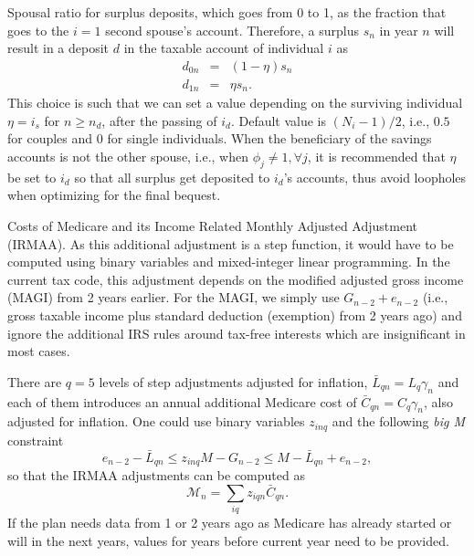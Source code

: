 \documentclass{report}[fleqn,12pt]
\begin{document}
\begin{description}[leftmargin=4em,style=multiline]
\item [$\eta$]
	Spousal ratio for surplus deposits, which goes from 0 to 1, as the fraction
	that goes to the $i = 1$ second spouse's account. Therefore, a surplus $s_n$ in year $n$
	will result in a deposit $d$ in the taxable account of individual $i$ as
	\begin{eqnarray}
		\label{Eq:eta}
		d_{0n} & = & (1 - \eta) s_n \nonumber\\
		d_{1n} & = & \eta s_n.
	\end{eqnarray}
	This choice is such that we can set a value depending on the surviving
	individual $\eta = i_s$ for $n \ge n_d$, after the passing of $i_d$.
	Default value is $(N_i - 1)/2$, i.e., $0.5$ for couples and $0$ for single individuals.
	When the beneficiary of the savings accounts is not the other spouse, i.e., 
	when $\phi_j \neq 1, \forall j$, it is recommended that $\eta$ be set to $i_d$ so that
	all surplus get deposited to $i_d$'s accounts,
	thus avoid loopholes when optimizing for the final bequest.
\item [$\mathcal{M}_n$]
	Costs of Medicare and its Income Related Monthly Adjusted Adjustment (IRMAA).
	As this additional adjustment
	is a step function, it would have to be computed using binary variables and mixed-integer linear
	programming. In the current tax code, this adjustment
	depends on the modified adjusted gross income (MAGI) from 2 years earlier. For the
	MAGI, we simply use $G_{n-2} + e_{n-2}$ (i.e., gross taxable income
	plus standard deduction (exemption) from 2 years ago) and ignore the additional IRS
	rules around tax-free interests which are insignificant in most cases.

	There are $q=5$ levels
	of step adjustments adjusted for inflation,
	$\bar{L}_{qn} = L_q\gamma_n$ and each of them introduces
	an annual additional Medicare
	cost of $\bar{C}_{qn} = C_q\gamma_n$, also adjusted for inflation.
	One could use binary variables $z_{inq}$ and the following {\em big M} constraint
	\begin{equation}
		e_{n-2} -\bar{L}_{qn} \le z_{inq} M - G_{n-2}
		 \le M - \bar{L}_{qn} + e_{n-2},
	\end{equation}
	so that the IRMAA adjustments can be computed as
	\begin{equation}
		\label{Eq:IRMAA}
		\mathcal{M}_n = \sum_{iq} z_{iqn} \bar{C}_{qn}.
	\end{equation}
	If the plan needs data from 1 or 2 years ago as Medicare has already started or will in the next years,
        values for years before current year need to be provided.


\end{description}
\end{document}
